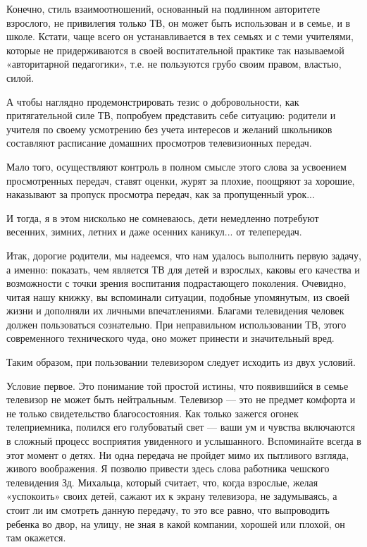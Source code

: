 \documentclass[12pt, a4paper, openany]{book}
\begin{document}
Конечно, стиль взаимоотношений, основанный на подлинном авторитете взрослого, не привилегия только ТВ, он может быть использован и в семье, и в школе. Кстати, чаще всего он устанавливается в тех семьях и с теми учителями, которые не придерживаются в своей воспитательной практике так называемой «авторитарной педагогики», т.е. не пользуются грубо своим правом, властью, силой. 

А чтобы наглядно продемонстрировать тезис о добровольности, как притягательной силе ТВ, попробуем представить себе ситуацию: родители и учителя по своему усмотрению без учета интересов и желаний школьников составляют расписание домашних просмотров телевизионных передач. 

Мало того, осуществляют контроль в полном смысле этого слова за усвоением просмотренных передач, ставят оценки, журят за плохие, поощряют за хорошие, наказывают за пропуск просмотра передач, как за пропущенный урок... 

И тогда, я в этом нисколько не сомневаюсь, дети немедленно потребуют весенних, зимних, летних и даже осенних каникул... от телепередач. 

Итак, дорогие родители, мы надеемся, что нам удалось выполнить первую задачу, а именно: показать, чем является ТВ для детей и взрослых, каковы его качества и возможности с точки зрения воспитания подрастающего поколения. Очевидно, читая нашу книжку, вы вспоминали ситуации, подобные упомянутым, из своей жизни и дополняли их личными впечатлениями. Благами телевидения человек должен пользоваться сознательно. При неправильном использовании ТВ, этого современного технического чуда, оно может принести и значительный вред. 

Таким образом, при пользовании телевизором следует исходить из двух условий. 

Условие первое. Это понимание той простой истины, что появившийся в семье телевизор не может быть нейтральным. Телевизор — это не предмет комфорта и не только свидетельство благосостояния. Как только зажегся огонек телеприемника, полился его голубоватый свет — ваши ум и чувства включаются в сложный процесс восприятия увиденного и услышанного. Вспоминайте всегда в этот момент о детях. Ни одна передача не пройдет мимо их пытливого взгляда, живого воображения. Я позволю привести здесь слова работника чешского телевидения Зд. Михальца, который считает, что, когда взрослые, желая «успокоить» своих детей, сажают их к экрану телевизора, не задумываясь, а стоит ли им смотреть данную передачу, то это все равно, что выпроводить ребенка во двор, на улицу, не зная в какой компании, хорошей или плохой, он там окажется. 
\end{document}
